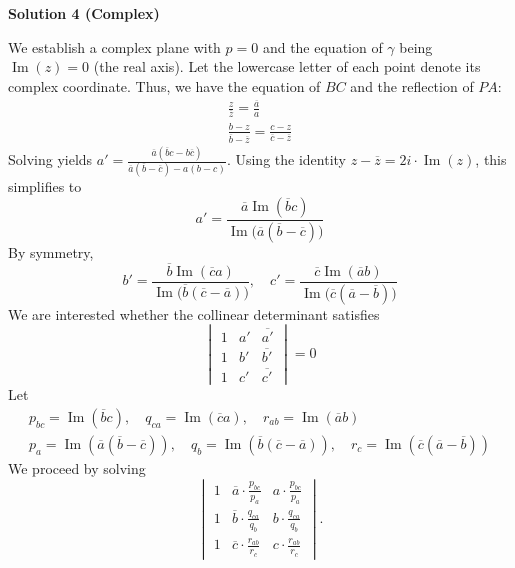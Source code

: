 \begin{enumerate}
\textbf{Solution 4 (Complex)}

We establish a complex plane with $p=0$ and the equation of $\gamma$ being $\operatorname{Im}(z)=0$ (the real axis). Let the lowercase letter of each point denote its complex coordinate. Thus, we have the equation of $BC$ and the reflection of $PA$:\begin{gather*}\frac{z}{\overline z}=\frac{\overline a}{a}\\\frac{b-z}{\overline b-\overline z}=\frac{c-z}{\overline c-\overline z}\end{gather*}Solving yields $a'=\frac{\overline{a}(\overline{b}c-b\overline{c})}{\overline{a}(\overline{b}-\overline{c})-a(b-c)}$. Using the identity $z-\overline{z}=2i\cdot \operatorname{Im}(z)$, this simplifies to
 \[a'=\frac{\overline{a}\operatorname{Im}(\overline{b}c)}{\operatorname{Im}\bigl(\overline{a}(\overline{b}-\overline{c})\bigr)}\]By symmetry,
 \[b'=\frac{\overline{b}\operatorname{Im}(\overline{c}a)}{\operatorname{Im}\bigl(\overline{b}(\overline{c}-\overline{a})\bigr)},\quad c'=\frac{\overline{c}\operatorname{Im}(\overline{a}b)}{\operatorname{Im}\bigl(\overline{c}(\overline{a}-\overline{b})\bigr)}\]We are interested whether the collinear determinant satisfies
 \[\begin{vmatrix} 1 & a' & \overline{a'} \\ 1 & b' & \overline{b'} \\ 1 & c' & \overline{c'} \end{vmatrix}=0\]Let \begin{gather*}p_{bc}=\operatorname{Im}(\overline b c),\quad q_{ca}=\operatorname{Im}(\overline c a), \quad r_{ab}=\operatorname{Im}(\overline a b)\\p_a=\operatorname{Im}(\overline a(\overline b-\overline c)),\quad q_b=\operatorname{Im}(\overline b(\overline c-\overline a)),\quad r_c=\operatorname{Im}(\overline c(\overline a-\overline b))\end{gather*} We proceed by solving 
 \[\begin{vmatrix} 1 & \overline a\cdot\frac{p_{bc}}{p_a} & a\cdot\frac{p_{bc}}{p_a} \\ 1 & \overline b\cdot\frac{q_{ca}}{q_b} & b\cdot\frac{q_{ca}}{q_b} \\ 1 & \overline c\cdot\frac{r_{ab}}{r_c} & c\cdot\frac{r_{ab}}{r_c} \end{vmatrix}.\]


\end{enumerate}
